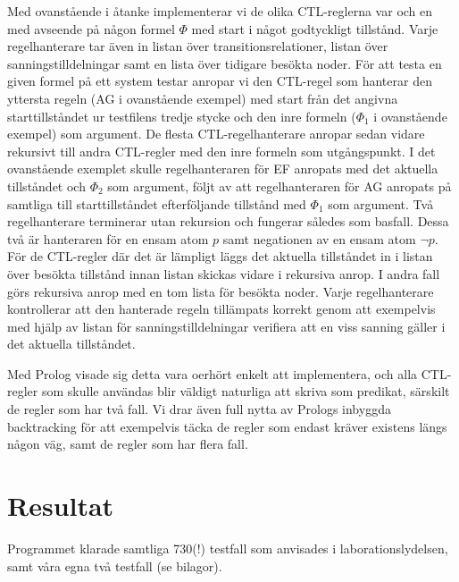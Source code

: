\documentclass[a4paper,11pt]{article}
\begin{document}
\bigskip
\noindent
Med ovanstående i åtanke implementerar vi de olika CTL-reglerna var och en med
avseende på någon formel $\Phi$ med start i något godtyckligt tillstånd. Varje regelhanterare
tar även in listan över transitionsrelationer, listan över sanningstilldelningar samt
en lista över tidigare besökta noder.
För att
testa en given formel på ett system testar anropar vi den CTL-regel som 
hanterar den yttersta regeln (AG i ovanstående exempel) med start från det angivna
starttillståndet ur testfilens tredje stycke och den inre formeln ($\Phi_1$ i ovanstående
exempel) som argument. De flesta CTL-regelhanterare anropar sedan vidare rekursivt
till andra CTL-regler med den inre formeln som utgångspunkt. I det ovanstående exemplet skulle
regelhanteraren för EF anropats med det aktuella tillståndet och $\Phi_2$ som argument, 
följt av att regelhanteraren för AG anropats på samtliga till starttillståndet efterföljande
tillstånd med $\Phi_1$ som argument. Två regelhanterare terminerar
utan rekursion och fungerar således som basfall. Dessa två är hanteraren för en ensam
atom $p$ samt negationen av en ensam atom $\lnot p$. För de CTL-regler där det är lämpligt
läggs det aktuella tillståndet in i listan över besökta tillstånd innan listan skickas
vidare i rekursiva anrop. I andra fall görs rekursiva anrop med en tom lista för besökta
noder. Varje regelhanterare kontrollerar att den hanterade regeln tillämpats korrekt genom
att exempelvis med hjälp av listan för sanningstilldelningar verifiera att en viss sanning
gäller i det aktuella tillståndet.

\bigskip
\noindent
Med Prolog visade sig detta vara oerhört enkelt att implementera, och alla CTL-regler som
skulle användas blir väldigt naturliga att skriva som predikat, särskilt de
regler som har två fall. Vi drar även full nytta av Prologs inbyggda backtracking för att
exempelvis täcka de regler som endast kräver existens längs någon väg, samt de regler
som har flera fall.

\section{Resultat}
\noindent
Programmet klarade samtliga 730(!) testfall som anvisades i laborationslydelsen, samt våra egna två testfall (se bilagor).
\end{document}
